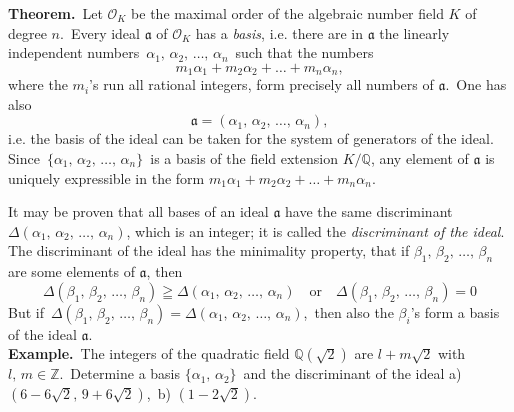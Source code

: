 \documentclass[12pt]{article}
\theoremstyle{definition}
\begin{document}
\textbf{Theorem.}\, Let $\mathcal{O}_K$ be the maximal order of the algebraic number field $K$ of degree $n$.\, Every ideal $\mathfrak{a}$  of $\mathcal{O}_K$ has a {\em basis}, i.e. there are in $\mathfrak{a}$ the linearly independent numbers\, $\alpha_1,\,\alpha_2,\,\ldots,\,\alpha_n$\, such that the numbers
$$m_1\alpha_1+m_2\alpha_2+\ldots+m_n\alpha_n,$$
where the $m_i$'s run all rational integers, form precisely all numbers of $\mathfrak{a}$.\, One has also
$$\mathfrak{a} = (\alpha_1,\,\alpha_2,\,\ldots,\,\alpha_n),$$
i.e. the basis of the ideal can be taken for the system of generators of the ideal.\\

Since\, $\{\alpha_1,\,\alpha_2,\,\ldots,\,\alpha_n\}$\, is a basis of the field extension $K/\mathbb{Q}$, any element of $\mathfrak{a}$ is uniquely expressible in the form $m_1\alpha_1+m_2\alpha_2+\ldots+m_n\alpha_n$.

It may be proven that all bases of an ideal $\mathfrak{a}$ have the same discriminant $\Delta(\alpha_1,\,\alpha_2,\,\ldots,\,\alpha_n)$, which is an integer; it is called the {\em discriminant of the ideal}.\, The discriminant of the ideal has the minimality property, that if $\beta_1,\,\beta_2,\,\ldots,\,\beta_n$ are some elements of $\mathfrak{a}$, then
$$\Delta(\beta_1,\,\beta_2,\,\ldots,\,\beta_n) \geqq \Delta(\alpha_1,\,\alpha_2,\,\ldots,\,\alpha_n)
\quad \mbox{or} \quad \Delta(\beta_1,\,\beta_2,\,\ldots,\,\beta_n) = 0$$
But if\, $\Delta(\beta_1,\,\beta_2,\,\ldots,\,\beta_n) = \Delta(\alpha_1,\,\alpha_2,\,\ldots,\,\alpha_n)$,\, then also the $\beta_i$'s form a basis of the ideal $\mathfrak{a}$.\\

\textbf{Example.}\, The integers of the quadratic field $\mathbb{Q}(\sqrt{2})$ are $l+m\sqrt{2}$ with\, $l,\,m \in \mathbb{Z}$.\, Determine a basis $\{\alpha_1,\,\alpha_2\}$\, and the discriminant of the ideal 
a)\, $(6\!-\!6\sqrt{2},\,9\!+\!6\sqrt{2})$,\, b) $(1\!-\!2\sqrt{2})$.
\end{document}
